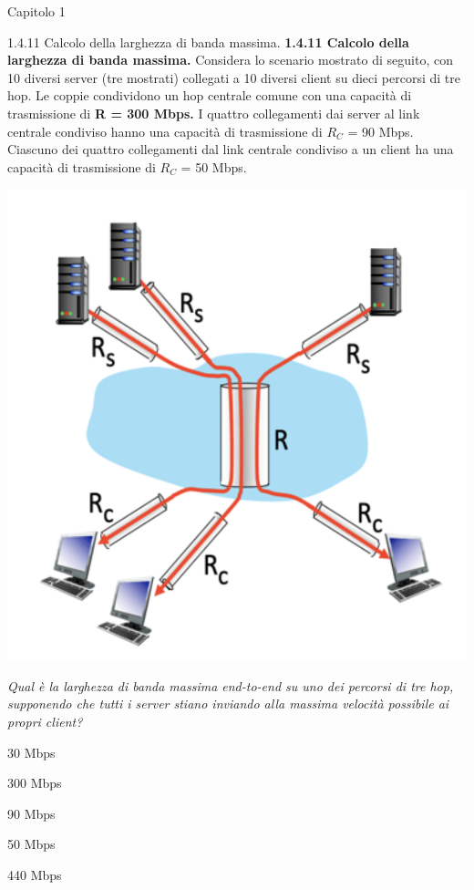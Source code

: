 \documentclass[a4paper]{article}
\begin{document}
\begin{quiz}{Capitolo 1}
\begin{multi}[points=1]{1.4.11 Calcolo della larghezza di banda massima.}
\textbf{1.4.11 Calcolo della larghezza di banda massima.} 
Considera lo scenario mostrato di seguito, con 10 diversi server (tre mostrati) collegati a 10 diversi client su dieci percorsi di tre hop. Le coppie condividono un hop centrale comune con una capacità di trasmissione di \textbf{R = 300 Mbps.} I quattro collegamenti dai server al link centrale condiviso hanno una capacità di trasmissione di $R_C$ = 90 Mbps. Ciascuno dei quattro collegamenti dal link centrale condiviso a un client ha una capacità di trasmissione di $R_C$ = 50 Mbps.
\begin{center}
\includegraphics[width=\linewidth]{figs/1.4.11.png}
\end{center}

\emph{Qual è la larghezza di banda massima end-to-end su uno dei percorsi di tre hop, supponendo che tutti i server stiano inviando alla massima velocità possibile ai propri client?}
\item* 30 Mbps
\item 300 Mbps
\item 90 Mbps
\item 50 Mbps
\item 440 Mbps
\end{multi}


\end{quiz}
\end{document}
